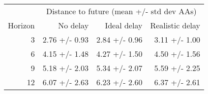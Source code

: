 
\begin{tabular*}{0.7\textwidth}{rrrr}
\toprule
          & \multicolumn{3}{c}{Distance to future (mean +/- std dev AAs)} \\
  Horizon & No delay & Ideal delay & Realistic delay \\
\midrule

3 & 2.76 +/- 0.93 & 2.84 +/- 0.96 & 3.11 +/- 1.00 \\
6 & 4.15 +/- 1.48 & 4.27 +/- 1.50 & 4.50 +/- 1.56 \\
9 & 5.18 +/- 2.03 & 5.34 +/- 2.07 & 5.59 +/- 2.25 \\
12 & 6.07 +/- 2.63 & 6.23 +/- 2.60 & 6.37 +/- 2.61 \\

\bottomrule
\end{tabular*}

